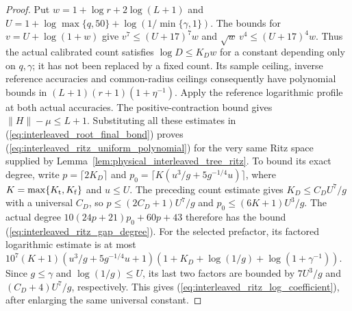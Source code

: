 \begin{proof}\leanok
    Put $w=1+\log r+2\log(L+1)$ and
    $U=1+\log\max\{q,50\}+\log(1/\min\{\gamma,1\})$.
    The bounds for $v=U+\log(1+w)$ give
    $v^7\le(U+17)^7w$ and
    $\sqrt w\,v^4\le(U+17)^4w$. Thus the actual calibrated count satisfies
    $\log D\le K_Dw$ for a constant depending only on $q,\gamma$;
    it has not been replaced by a fixed count. Its sample ceiling,
    inverse reference accuracies and common-radius ceilings consequently
    have polynomial bounds in $(L+1)(r+1)(1+\eta^{-1})$.
    Apply the reference logarithmic profile at both actual accuracies.
    The positive-contraction bound gives $\|H\|-\mu\le L+1$.
    Substituting all these estimates in
    (\ref{eq:interleaved_root_final_bond}) proves
    (\ref{eq:interleaved_ritz_uniform_polynomial}) for the very same Ritz
    space supplied by Lemma~\ref{lem:physical_interleaved_tree_ritz}.
    To bound its exact degree, write
    $p=\lceil2K_D\rceil$ and
    $p_0=\lceil K(u^3/g+5g^{-1/4}u)\rceil$, where
    $K=\max\{K_{\rm t},K_{\rm f}\}$ and $u\le U$.
    The preceding count estimate gives $K_D\le C_DU^7/g$ with a universal
    $C_D$, so $p\le(2C_D+1)U^7/g$ and
    $p_0\le(6K+1)U^3/g$. The actual degree
    $10(24p+21)p_0+60p+43$ therefore has the bound
    (\ref{eq:interleaved_ritz_gap_degree}). For the selected prefactor,
    its factored logarithmic estimate is at most
    $10^7(K+1)(u^3/g+5g^{-1/4}u+1)
        (1+K_D+\log(1/g)+\log(1+\gamma^{-1}))$.
    Since $g\le\gamma$ and $\log(1/g)\le U$, its last two factors are
    bounded by $7U^3/g$ and $(C_D+4)U^7/g$, respectively.
    This gives (\ref{eq:interleaved_ritz_log_coefficient}), after enlarging
    the same universal constant.
\end{proof}

